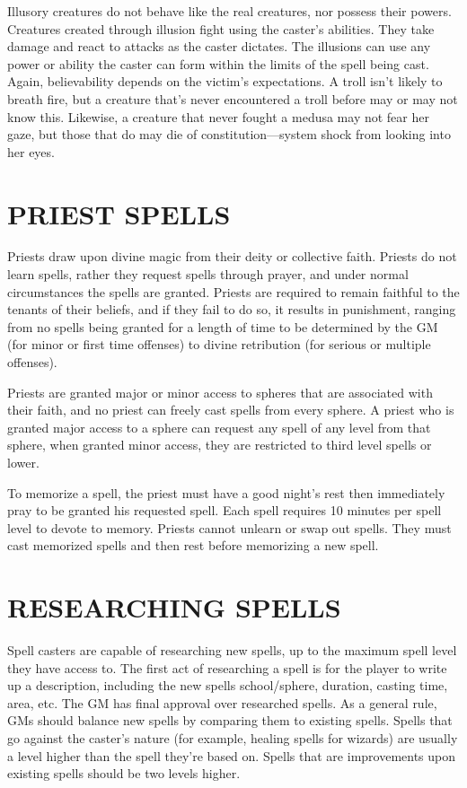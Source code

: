 \begin{multicols}{2}
Illusory creatures do not behave like the real creatures, nor possess their powers.  Creatures created through illusion fight using the caster's abilities.  They take damage and react to attacks as the caster dictates.  The illusions can use any power or ability the caster can form within the limits of the spell being cast.  Again, believability depends on the victim's expectations.  A troll isn't likely to breath fire, but a creature that's never encountered a troll before may or may not know this.  Likewise, a creature that never fought a medusa may not fear her gaze, but those that do may die of constitution---system shock from looking into her eyes.

\section{PRIEST SPELLS}

Priests draw upon divine magic from their deity or collective faith.  Priests do not learn spells, rather they request spells through prayer, and under normal circumstances the spells are granted.  Priests are required to remain faithful to the tenants of their beliefs, and if they fail to do so, it results in punishment, ranging from no spells being granted for a length of time to be determined by the GM (for minor or first time offenses) to divine retribution (for serious or multiple offenses).  

Priests are granted major or minor access to spheres that are associated with their faith, and no priest can freely cast spells from every sphere.  A priest who is granted major access to a sphere can request any spell of any level from that sphere, when granted minor access, they are restricted to third level spells or lower.  

To memorize a spell, the priest must have a good night's rest then immediately pray to be granted his requested spell.  Each spell requires 10 minutes per spell level to devote to memory.  Priests cannot unlearn or swap out spells.  They must cast memorized spells and then rest before memorizing a new spell.

\section{RESEARCHING SPELLS}

Spell casters are capable of researching new spells, up to the maximum spell level they have access to.  The first act of researching a spell is for the player to write up a description, including the new spells school/sphere, duration, casting time, area, etc.  The GM has final approval over researched spells.  As a general rule, GMs should balance new spells by comparing them to existing spells.  Spells that go against the caster's nature (for example, healing spells for wizards) are usually a level higher than the spell they're based on.  Spells that are improvements upon existing spells should be two levels higher.  


\end{multicols}
